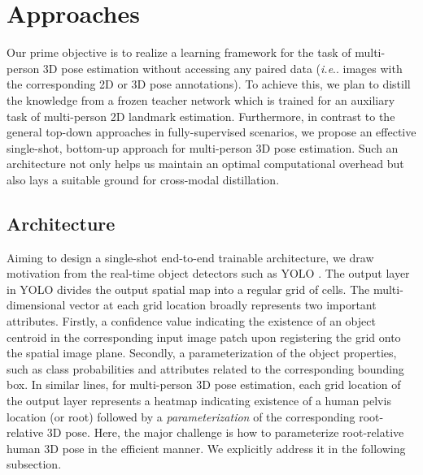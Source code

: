 \documentclass[runningheads]{llncs}
\makeatletter
\DeclareRobustCommand\onedot{\futurelet\@let@token\@onedot}
\def\@onedot{\ifx\@let@token.\else.\null\fi\xspace}
\def\ie{\emph{i.e}\onedot} \def\Ie{\emph{I.e}\onedot}
\makeatother
\begin{document}
\section{Approaches}

Our prime objective is to realize a learning framework for the task of multi-person 3D pose estimation without accessing any paired data (\ie images with the corresponding 2D or 3D pose annotations). To achieve this, we plan to distill the knowledge from a frozen teacher network which is trained for an auxiliary task of multi-person 2D landmark estimation. Furthermore, in contrast to the general top-down approaches in fully-supervised scenarios, we propose an effective single-shot, bottom-up approach for multi-person 3D pose estimation. Such an architecture not only helps us maintain an {optimal computational overhead} but also lays a suitable ground for cross-modal distillation.

\subsection{Architecture}
Aiming to design a single-shot end-to-end trainable architecture, we draw motivation from the real-time object detectors such as YOLO \cite{redmon2016you}. The output layer in YOLO divides the output spatial map into a regular grid of cells. The multi-dimensional vector at each grid location broadly represents two important attributes. Firstly, a confidence value indicating the existence of an object centroid in the corresponding input image patch upon registering the grid onto the spatial image plane. Secondly, a parameterization of the object properties, such as class probabilities and attributes related to the corresponding bounding box. In similar lines, for multi-person 3D pose estimation, each grid location of the output layer represents a heatmap indicating existence of a human pelvis location (or root) followed by a \textit{parameterization} of the corresponding root-relative 3D pose. Here, the major challenge is how to parameterize root-relative human 3D pose in the efficient manner. We explicitly address it in the following subsection.
\end{document}
